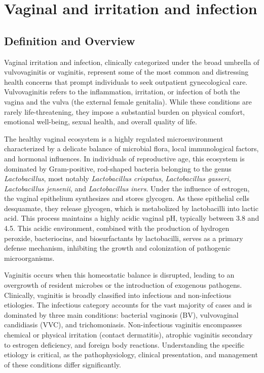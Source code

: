 \chapter{Vaginal and irritation and infection}

\section*{Definition and Overview}
Vaginal irritation and infection, clinically categorized under the broad umbrella of vulvovaginitis or vaginitis, represent some of the most common and distressing health concerns that prompt individuals to seek outpatient gynecological care. Vulvovaginitis refers to the inflammation, irritation, or infection of both the vagina and the vulva (the external female genitalia). While these conditions are rarely life-threatening, they impose a substantial burden on physical comfort, emotional well-being, sexual health, and overall quality of life.

The healthy vaginal ecosystem is a highly regulated microenvironment characterized by a delicate balance of microbial flora, local immunological factors, and hormonal influences. In individuals of reproductive age, this ecosystem is dominated by Gram-positive, rod-shaped bacteria belonging to the genus \textit{Lactobacillus}, most notably \textit{Lactobacillus crispatus}, \textit{Lactobacillus gasseri}, \textit{Lactobacillus jensenii}, and \textit{Lactobacillus iners}. Under the influence of estrogen, the vaginal epithelium synthesizes and stores glycogen. As these epithelial cells desquamate, they release glycogen, which is metabolized by lactobacilli into lactic acid. This process maintains a highly acidic vaginal pH, typically between 3.8 and 4.5. This acidic environment, combined with the production of hydrogen peroxide, bacteriocins, and biosurfactants by lactobacilli, serves as a primary defense mechanism, inhibiting the growth and colonization of pathogenic microorganisms.

Vaginitis occurs when this homeostatic balance is disrupted, leading to an overgrowth of resident microbes or the introduction of exogenous pathogens. Clinically, vaginitis is broadly classified into infectious and non-infectious etiologies. The infectious category accounts for the vast majority of cases and is dominated by three main conditions: bacterial vaginosis (BV), vulvovaginal candidiasis (VVC), and trichomoniasis. Non-infectious vaginitis encompasses chemical or physical irritation (contact dermatitis), atrophic vaginitis secondary to estrogen deficiency, and foreign body reactions. Understanding the specific etiology is critical, as the pathophysiology, clinical presentation, and management of these conditions differ significantly.


